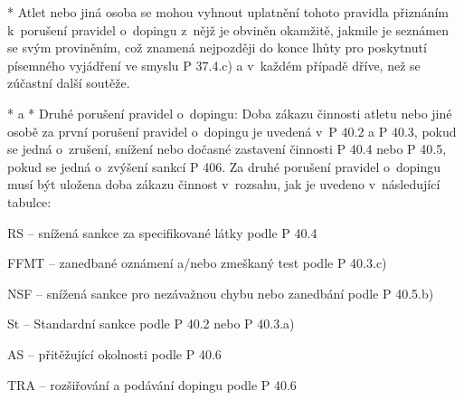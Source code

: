   * Atlet nebo jiná osoba se mohou vyhnout uplatnění tohoto pravidla přiznáním k~porušení pravidel o~dopingu z~nějž je obviněn okamžitě, jakmile je seznámen se svým proviněním, což znamená nejpozději do konce lhůty pro poskytnutí písemného vyjádření ve smyslu P 37.4.c) a v~každém případě dříve, než se zúčastní další soutěže.
  \enditems

* \begitems \style a
  * Druhé porušení pravidel o~dopingu: Doba zákazu činnosti atletu nebo jiné osobě za první porušení pravidel o~dopingu je uvedená v~P 40.2 a P 40.3, pokud se jedná o~zrušení, snížení nebo dočasné zastavení činnosti P 40.4 nebo P 40.5, pokud se jedná o~zvýšení sankcí P 406. Za druhé porušení pravidel o~dopingu musí být uložena doba zákazu činnost v~rozsahu, jak je uvedeno v~následující tabulce:


\noindent RS -- snížená sankce za specifikované látky podle P 40.4

\noindent FFMT -- zanedbané oznámení a/nebo zmeškaný test podle P 40.3.c)

\noindent NSF -- snížená sankce pro nezávažnou chybu nebo zanedbání podle P 40.5.b)

\noindent St -- Standardní sankce podle P 40.2 nebo P 40.3.a)

\noindent AS -- přitěžující okolnosti podle P 40.6

\noindent TRA -- rozšiřování a podávání dopingu podle P 40.6

